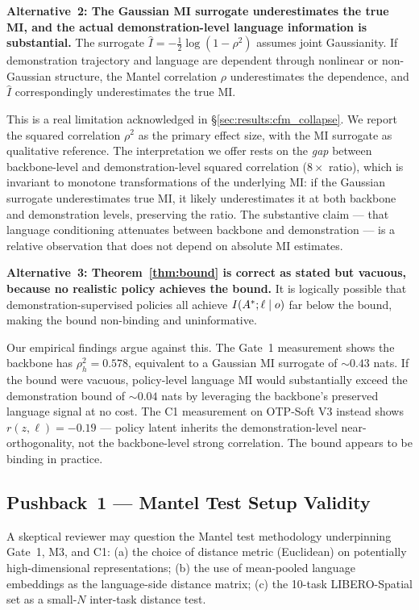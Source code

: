 \textbf{Alternative~2: The Gaussian MI surrogate underestimates the true MI, and the
actual demonstration-level language information is substantial.} The surrogate
$\hat{I} = -\tfrac{1}{2}\log(1 - \rho^2)$ assumes joint Gaussianity. If demonstration
trajectory and language are dependent through nonlinear or non-Gaussian structure, the
Mantel correlation $\rho$ underestimates the dependence, and $\hat{I}$ correspondingly
underestimates the true MI.

This is a real limitation acknowledged in \S\ref{sec:results:cfm_collapse}. We report the
squared correlation $\rho^2$ as the primary effect size, with the MI surrogate as
qualitative reference. The interpretation we offer rests on the \emph{gap} between
backbone-level and demonstration-level squared correlation ($8\times$ ratio), which is
invariant to monotone transformations of the underlying MI: if the Gaussian surrogate
underestimates true MI, it likely underestimates it at both backbone and demonstration
levels, preserving the ratio. The substantive claim --- that language conditioning
attenuates between backbone and demonstration --- is a relative observation that does not
depend on absolute MI estimates.

\textbf{Alternative~3: Theorem~\ref{thm:bound} is correct as stated but vacuous, because
no realistic policy achieves the bound.} It is logically possible that
demonstration-supervised policies all achieve $I(A^{*}; \ell \mid o)$ far below the
bound, making the bound non-binding and uninformative.

Our empirical findings argue against this. The Gate~1 measurement shows the backbone has
$\rho_h^2 = 0.578$, equivalent to a Gaussian MI surrogate of $\sim 0.43$ nats. If the
bound were vacuous, policy-level language MI would substantially exceed the demonstration
bound of $\sim 0.04$ nats by leveraging the backbone's preserved language signal at no
cost. The C1 measurement on OTP-Soft V3 instead shows $r(z, \ell) = -0.19$ --- policy
latent inherits the demonstration-level near-orthogonality, not the backbone-level strong
correlation. The bound appears to be binding in practice.

\subsection{Pushback~1 --- Mantel Test Setup Validity}
\label{sec:discussion:pushback_mantel}

A skeptical reviewer may question the Mantel test methodology underpinning Gate~1, M3,
and C1: (a) the choice of distance metric (Euclidean) on potentially high-dimensional
representations; (b) the use of mean-pooled language embeddings as the language-side
distance matrix; (c) the 10-task LIBERO-Spatial set as a small-$N$ inter-task distance
test.


